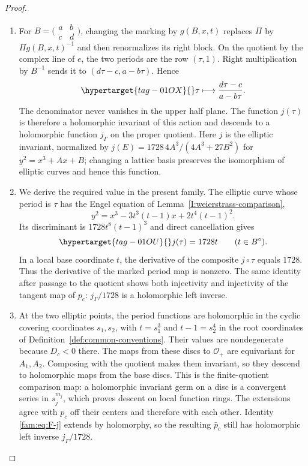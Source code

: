 \begin{proof}
\begin{enumerate}[label=\arabic*.,leftmargin=*]
\item For $B=\bigl(\begin{smallmatrix}a&b\\c&d\end{smallmatrix}\bigr)$, changing
the marking by $g(B,x,t)$ replaces $\Pi$ by $\Pi g(B,x,t)^{-1}$ and then
renormalizes its right block.  On the quotient by the complex line of
$e$, the two periods are the row $(\tau,1)$.  Right multiplication by
$B^{-1}$ sends it to $(d\tau-c,a-b\tau)$.  Hence
\begin{equation}\hypertarget{tag-01OX}{}\label{fam:eq:F-tauaction}
 \tau\longmapsto\frac{d\tau-c}{a-b\tau}.
\end{equation}
The denominator never vanishes in the upper half plane.  The function
$j(\tau)$ is therefore a holomorphic invariant of this action and
descends to a holomorphic function $j_\Gamma$ on the proper quotient.
Here $j$ is the elliptic invariant, normalized by
$j(E)=1728\,4A^3/(4A^3+27B^2)$ for $y^2=x^3+Ax+B$; changing a lattice
basis preserves the isomorphism of elliptic curves and hence this
function.

\item We derive the required value in the present family.  The elliptic curve
whose period is $\tau$ has the Engel equation of
Lemma~\ref{I:weierstrass-comparison},
\[
 y^2=x^3-3t^3(t-1)x+2t^4(t-1)^2.
\]
Its discriminant is $1728t^8(t-1)^3$ and direct cancellation gives
\begin{equation}\hypertarget{tag-01OU}{}\label{fam:eq:F-j}
 j(\tau)=1728t\qquad(t\in B^\circ).
\end{equation}
In a local base coordinate $t$, the
derivative of the composite $j\circ\tau$ equals $1728$.  Thus the
derivative of the marked period map is nonzero.  The same identity after
passage to the quotient shows both injectivity and injectivity of the
tangent map of $p_c$: $j_\Gamma/1728$ is a holomorphic left inverse.

\item At the two elliptic points, the period functions are holomorphic in the
cyclic covering coordinates $s_1,s_2$, with $t=s_1^3$ and
$t-1=s_2^4$ in the root coordinates of Definition~\ref{def:common-conventions}.  Their
values are nondegenerate because $D_c<0$ there.  The maps from these
discs to $\mathcal O_+$ are equivariant for $A_1,A_2$.  Composing with
the quotient makes them invariant, so they descend to holomorphic maps
from the base discs.  This is the finite-quotient comparison map: a
holomorphic invariant germ on a disc is a convergent series in $s_j^{m_j}$,
which proves descent on local function rings.  The extensions agree
with $p_c$ off their centers and therefore with each other.  Identity
\eqref{fam:eq:F-j} extends by holomorphy, so the resulting $\bar p_c$ still
has holomorphic left inverse $j_\Gamma/1728$.


\end{enumerate}
\end{proof}
